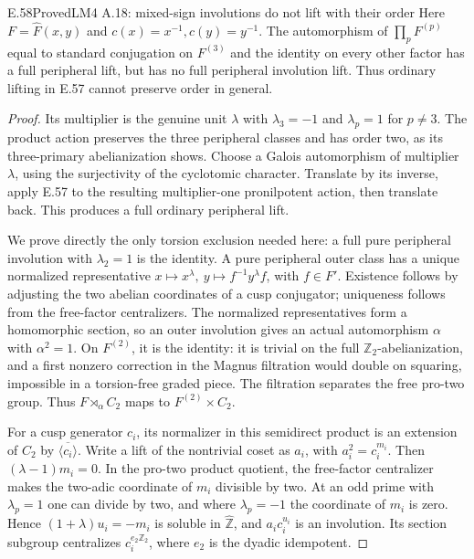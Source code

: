 \begin{result}{E.58}{Proved}{LM4 A.18: mixed-sign involutions do not lift with their order}
Here \(F=\widehat F(x,y)\) and \(c(x)=x^{-1},c(y)=y^{-1}\).
The automorphism of \(\prod_pF^{(p)}\) equal to standard conjugation
on \(F^{(3)}\) and the identity on every other factor has a full
peripheral lift, but has no full peripheral involution lift.
Thus ordinary lifting in E.57 cannot preserve order in general.
\end{result}
\begin{proof}
Its multiplier is the genuine unit \(\lambda\) with
\(\lambda_3=-1\) and \(\lambda_p=1\) for \(p\ne3\).
The product action preserves the three peripheral classes and has
order two, as its three-primary abelianization shows. Choose a Galois
automorphism of multiplier \(\lambda\), using the surjectivity of
the cyclotomic character. Translate by its inverse, apply E.57 to the
resulting multiplier-one pronilpotent action, then translate back.
This produces a full ordinary peripheral lift.

We prove directly the only torsion exclusion needed here: a full pure
peripheral involution with \(\lambda_2=1\) is the identity.
A pure peripheral outer class has a unique normalized representative
\(x\mapsto x^\lambda,\ y\mapsto f^{-1}y^\lambda f\), with
\(f\in F'\). Existence follows by adjusting the two abelian
coordinates of a cusp conjugator; uniqueness follows from the
free-factor centralizers. The normalized representatives form a
homomorphic section, so an outer involution gives an actual
automorphism \(\alpha\) with \(\alpha^2=1\).
On \(F^{(2)}\), it is the identity: it is trivial on the full
\(\mathbb Z_2\)-abelianization, and a first nonzero correction in
the Magnus filtration would double on squaring, impossible in a
torsion-free graded piece. The filtration separates the free pro-two
group. Thus \(F\rtimes_\alpha C_2\) maps to
\(F^{(2)}\times C_2\).

For a cusp generator \(c_i\), its normalizer in this semidirect
product is an extension of \(C_2\) by
\(\overline{\langle c_i\rangle}\). Write a lift of the nontrivial
coset as \(a_i\), with \(a_i^2=c_i^{m_i}\).
Then \((\lambda-1)m_i=0\). In the pro-two product quotient,
the free-factor centralizer makes the two-adic coordinate of
\(m_i\) divisible by two. At an odd prime with \(\lambda_p=1\)
one can divide by two, and where \(\lambda_p=-1\) the coordinate
of \(m_i\) is zero. Hence
\((1+\lambda)u_i=-m_i\) is soluble in \(\widehat{\mathbb Z}\),
and \(a_ic_i^{u_i}\) is an involution. Its section subgroup
centralizes \(c_i^{e_2\mathbb Z_2}\), where \(e_2\) is the
dyadic idempotent.


\end{proof}

